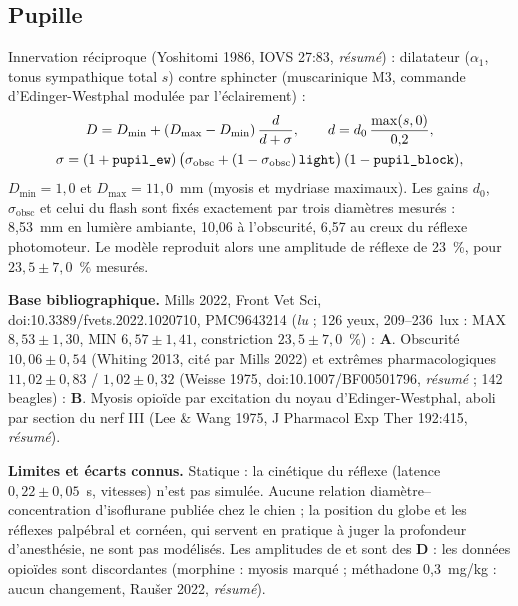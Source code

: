 \documentclass[10pt,a4paper]{article}
\newcommand{\vp}[1]{\text{\texttt{\detokenize{#1}}}}
\newcommand{\evA}{\textcolor{green!45!black}{\textbf{A}}}
\newcommand{\evB}{\textcolor{green!45!black}{\textbf{B}}}
\newcommand{\evD}{\textcolor{red!70!black}{\textbf{D}}}
\newcommand{\acc}[1]{\textsl{#1}}
\newcommand{\limite}[1]{\par\textbf{Limites et écarts connus.} #1}
\newcommand{\sources}[1]{\par\textbf{Base bibliographique.} #1}
\begin{document}
\subsection{Pupille}\label{sec:pupille}
Innervation réciproque (Yoshitomi 1986, IOVS 27:83, \acc{résumé}) : dilatateur ($\alpha_1$, tonus
sympathique total $s$) contre sphincter (muscarinique M3, commande d'Edinger-Westphal modulée par
l'éclairement) :
\begin{gather}
D = D_\text{min} + (D_\text{max} - D_\text{min})\,\frac{d}{d + \sigma},\qquad
d = d_0\,\frac{\max(s, 0)}{0{,}2},\\
\sigma = (1 + \vp{pupil_ew})\,\big(\sigma_\text{obsc} + (1 - \sigma_\text{obsc})\,\vp{light}\big)\,(1 - \vp{pupil_block}),
\end{gather}
$D_\text{min} = 1{,}0$ et $D_\text{max} = 11{,}0$~mm (myosis et mydriase maximaux). Les gains $d_0$,
$\sigma_\text{obsc}$ et celui du flash sont fixés exactement par trois diamètres mesurés :
8,53~mm en lumière ambiante, 10,06 à l'obscurité, 6,57 au creux du réflexe photomoteur. Le modèle
reproduit alors une amplitude de réflexe de 23~\%, pour $23{,}5 \pm 7{,}0$~\% mesurés.
\sources{Mills 2022, Front Vet Sci, doi:10.3389/fvets.2022.1020710, PMC9643214 (\acc{lu} ; 126 yeux,
209--236~lux : MAX $8{,}53 \pm 1{,}30$, MIN $6{,}57 \pm 1{,}41$, constriction $23{,}5 \pm 7{,}0$~\%) : \evA{}.
Obscurité $10{,}06 \pm 0{,}54$ (Whiting 2013, cité par Mills 2022) et extrêmes pharmacologiques
$11{,}02 \pm 0{,}83$ / $1{,}02 \pm 0{,}32$ (Weisse 1975, doi:10.1007/BF00501796, \acc{résumé} ;
142 beagles) : \evB{}. Myosis opioïde par excitation du noyau d'Edinger-Westphal, aboli par section
du nerf III (Lee \& Wang 1975, J Pharmacol Exp Ther 192:415, \acc{résumé}).}
\limite{Statique : la cinétique du réflexe (latence $0{,}22 \pm 0{,}05$~s, vitesses) n'est pas
simulée. Aucune relation diamètre--concentration d'isoflurane publiée chez le chien ; la position
du globe et les réflexes palpébral et cornéen, qui servent en pratique à juger la profondeur
d'anesthésie, ne sont pas modélisés. Les amplitudes de \vp{pupil_ew} et \vp{pupil_block} sont des
\evD{} : les données opioïdes sont discordantes (morphine : myosis marqué ; méthadone 0,3~mg/kg :
aucun changement, Raušer 2022, \acc{résumé}).}
\end{document}
